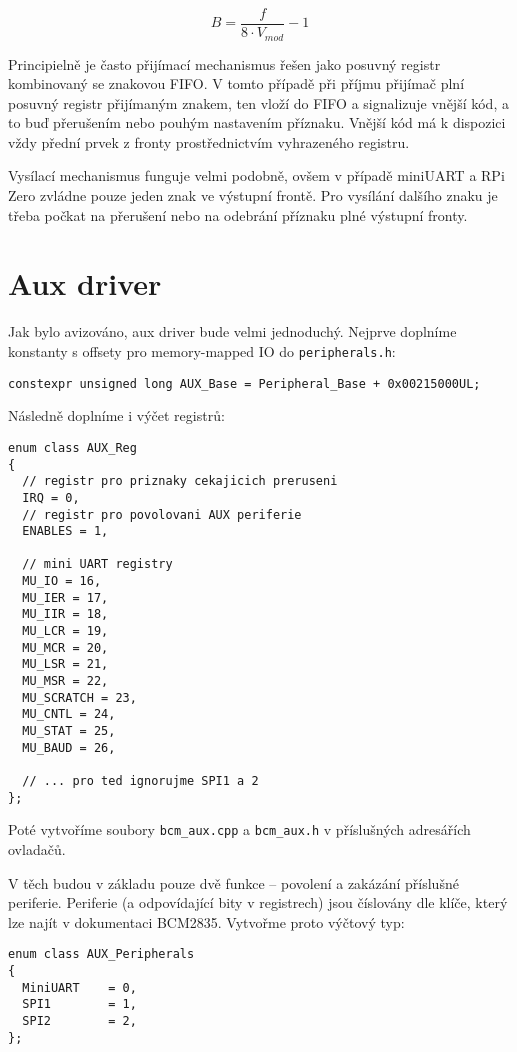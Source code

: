 \documentclass{article}
\begin{document}
\begin{equation}
B = \frac{f}{8\cdot V_{mod}} - 1
\end{equation}

Principielně je často přijímací mechanismus řešen jako posuvný registr kombinovaný se znakovou FIFO. V tomto případě při příjmu přijímač plní posuvný registr přijímaným znakem, ten vloží do FIFO a signalizuje vnější kód, a to buď přerušením nebo pouhým nastavením příznaku. Vnější kód má k dispozici vždy přední prvek z fronty prostřednictvím vyhrazeného registru.

Vysílací mechanismus funguje velmi podobně, ovšem v případě miniUART a RPi Zero zvládne pouze jeden znak ve výstupní frontě. Pro vysílání dalšího znaku je třeba počkat na přerušení nebo na odebrání příznaku plné výstupní fronty.




\section{Aux driver}

Jak bylo avizováno, aux driver bude velmi jednoduchý. Nejprve doplníme konstanty s offsety pro memory-mapped IO do \texttt{peripherals.h}:
\begin{lstlisting}
constexpr unsigned long AUX_Base = Peripheral_Base + 0x00215000UL;
\end{lstlisting}
Následně doplníme i výčet registrů:

\begin{lstlisting}
enum class AUX_Reg
{
  // registr pro priznaky cekajicich preruseni
  IRQ = 0,
  // registr pro povolovani AUX periferie
  ENABLES = 1,
	
  // mini UART registry	
  MU_IO = 16,
  MU_IER = 17,
  MU_IIR = 18,
  MU_LCR = 19,
  MU_MCR = 20,
  MU_LSR = 21,
  MU_MSR = 22,
  MU_SCRATCH = 23,
  MU_CNTL = 24,
  MU_STAT = 25,
  MU_BAUD = 26,

  // ... pro ted ignorujme SPI1 a 2
};
\end{lstlisting}

Poté vytvoříme soubory \texttt{bcm\_aux.cpp} a \texttt{bcm\_aux.h} v příslušných adresářích ovladačů.

V těch budou v základu pouze dvě funkce -- povolení a zakázání příslušné periferie. Periferie (a odpovídající bity v registrech) jsou číslovány dle klíče, který lze najít v dokumentaci BCM2835. Vytvořme proto výčtový typ:

\begin{lstlisting}
enum class AUX_Peripherals
{
  MiniUART    = 0,
  SPI1        = 1,
  SPI2        = 2,
};
\end{lstlisting}
\end{document}
